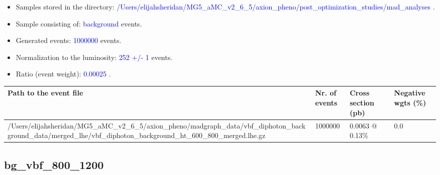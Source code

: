 \documentclass[a4paper, 10pt]{article}
\begin{document}
\begin{itemize}
  \item Samples stored in the directory: \textcolor{blue}{/\-Users/\-elijahsheridan/\-MG5\_aMC\_v2\_6\_5/\-axion\_pheno/\-post\_optimization\_studies/\-mad\_analyses} .
   \item Sample consisting of: \textcolor{blue}{background}  events.
   \item Generated events: \textcolor{blue}{1000000 }  events.
   \item Normalization to the luminosity: \textcolor{blue}{252}\textcolor{blue}{ +/\-- }\textcolor{blue}{1 }  events.
   \item Ratio (event weight): \textcolor{blue}{0.00025 } .  
 
\end{itemize}
\begin{table}[H]
  \begin{center}
    \begin{tabular}{|m{55.0mm}|m{25.0mm}|m{30.0mm}|m{30.0mm}|}
      \hline
      {\cellcolor{yellow}         Path to the event file}& {\cellcolor{yellow}         Nr. of events}& {\cellcolor{yellow}         Cross section (pb)}& {\cellcolor{yellow}         Negative wgts (\%)}\\
      \hline
      {\cellcolor{white}          /\-Users/\-elijahsheridan/\-MG5\_aMC\_v2\_6\_5/\-axion\_pheno/\-madgraph\_data/\-vbf\_diphoton\_background\_data/\-merged\_lhe/\-vbf\_diphoton\_background\_ht\_600\_800\_merged.lhe.gz}& {\cellcolor{white}          1000000}& {\cellcolor{white}          0.0063 @ 0.13\%}& {\cellcolor{white}          0.0}\\
\hline
    \end{tabular}
  \end{center}
\end{table}

\subsection{ bg\_vbf\_800\_1200}
\end{document}
